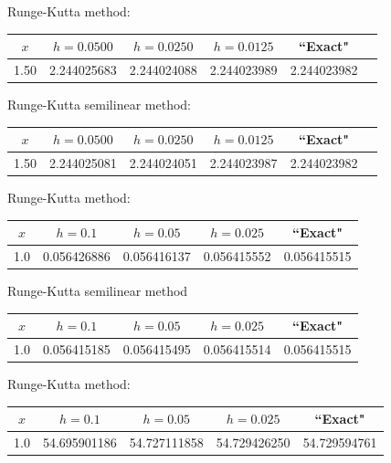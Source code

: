 {\small Runge-Kutta method:
\begin{tabular}{|c|r|r|r|r|r|}
\hline
\multicolumn{1}{|c|}{$x$}&
\multicolumn{1}{|c|}{$h=0.0500$}&
\multicolumn{1}{|c|}{$h=0.0250$}&
\multicolumn{1}{|c|}{$h=0.0125$}&
\multicolumn{1}{|c|}{``Exact"}\\ \hline
1.50 & 2.244025683 &2.244024088  & 2.244023989 & 2.244023982 \\
\hline
\end{tabular}}\bigskip

\hspace{.75in}
{\small Runge-Kutta semilinear method:
\begin{tabular}{|c|r|r|r|r|r|}
\hline
\multicolumn{1}{|c|}{$x$}&
\multicolumn{1}{|c|}{$h=0.0500$}&
\multicolumn{1}{|c|}{$h=0.0250$}&
\multicolumn{1}{|c|}{$h=0.0125$}&
\multicolumn{1}{|c|}{``Exact"}\\ \hline
1.50 & 2.244025081 & 2.244024051 & 2.244023987 & 2.244023982 \\
\hline
\end{tabular}}\bigskip

{\small Runge-Kutta method:
\begin{tabular}{|c|r|r|r|r|}
\hline
\multicolumn{1}{|c|}{$x$}&
\multicolumn{1}{|c|}{$h=0.1$}&
\multicolumn{1}{|c|}{$h=0.05$}&
\multicolumn{1}{|c|}{$h=0.025$}&
\multicolumn{1}{|c|}{``Exact"}\\ \hline
1.0 & 0.056426886 & 0.056416137 & 0.056415552 & 0.056415515 \\
\hline
\end{tabular}}\bigskip
\medskip


\hspace{.75in}
{\small Runge-Kutta semilinear method
\begin{tabular}{|c|r|r|r|r|}
\hline
\multicolumn{1}{|c|}{$x$}&
\multicolumn{1}{|c|}{$h=0.1$}&
\multicolumn{1}{|c|}{$h=0.05$}&
\multicolumn{1}{|c|}{$h=0.025$}&
\multicolumn{1}{|c|}{``Exact"}\\ \hline
1.0 & 0.056415185 & 0.056415495 & 0.056415514 & 0.056415515 \\
\hline
\end{tabular}}\bigskip

{\small Runge-Kutta method:
\begin{tabular}{|c|r|r|r|r|}
\hline
\multicolumn{1}{|c|}{$x$}&
\multicolumn{1}{|c|}{$h=0.1$}&
\multicolumn{1}{|c|}{$h=0.05$}&
\multicolumn{1}{|c|}{$h=0.025$}&
\multicolumn{1}{|c|}{``Exact"}\\ \hline
1.0 & 54.695901186 & 54.727111858 & 54.729426250 & 54.729594761 \\
\hline
\end{tabular}}\bigskip

